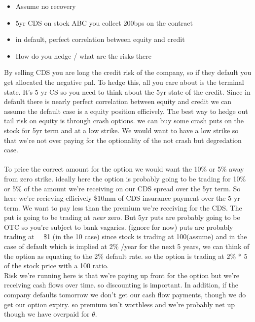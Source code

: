 \documentclass[a4paper,10pt]{article}
\begin{document}
\begin{sloppypar}
    \noindent
    \indent
    \begin{itemize}
        \item{Assume no recovery}
        \item{5yr CDS on stock ABC you collect 200bps on the contract}
        \item{in default, perfect correlation between equity and credit} 
        \item{How do you hedge / what are the risks there}
    \end{itemize}

    By selling CDS you are long the credit risk of the company, so if they default you get allocated the negative pnl. 
    To hedge this, all you care about is the terminal state. It's 5 yr CS so you need to think about the 5yr state of the credit.
    Since in default there is nearly perfect correlation between equity and credit we can assume the default case is a equity position efficively. 
    The best way to hedge out tail risk on equity is through crash options. we can buy some crash puts on the stock for 5yr term and at a low strike. 
    We would want to have a low strike so that we're not over paying for the optionality of the not crash but degredation case. \\
    \\
    To price the correct amount for the option we would want the 10\% or 5\% away from zero strike. ideally here the option is probably going to be trading for
    10\% or 5\% of the amount we're receiving on our CDS spread over the 5yr term. So here we're recieving efficively \$10mm of CDS insurance payment over the 5 yr term. 
    We want to pay less than the premium we're receiving for the CDS. The put is going to be trading at \textit{near} zero.
    But 5yr puts are probably going to be OTC so you're subject to bank vagaries. (ignore for now)
    puts are probably trading at ~~\$1 (in the 10 case) since stock is trading at 100(assume) and in the case of default which is implied at 2\% /year for the next 5 years,
    we can think of the option as equating to the 2\% default rate. so the option is trading at 2\% * 5 of the stock price with a 100 ratio.
    \\

    Risk we're running here is that we're paying up front for the option but we're receiving cash flows over time. so discounting is important.
    In addition, if the company defaults tomorrow we don't get our cash flow payments, though we do get our option expiry. so premium isn't worthless and we're probably net up 
    though we have overpaid for $\theta$. 

\end{sloppypar}
\end{document}
